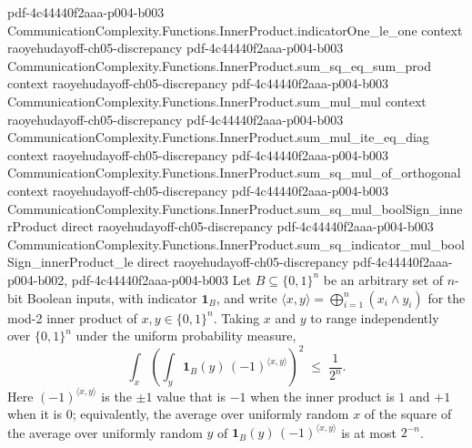 \begin{lemma}
  {pdf-4c44440f2aaa-p004-b003}
\proofstep
  {CommunicationComplexity.Functions.InnerProduct.indicatorOne_le_one}
  {context}
  {raoyehudayoff-ch05-discrepancy}
  {pdf-4c44440f2aaa-p004-b003}
\proofstep
  {CommunicationComplexity.Functions.InnerProduct.sum_sq_eq_sum_prod}
  {context}
  {raoyehudayoff-ch05-discrepancy}
  {pdf-4c44440f2aaa-p004-b003}
\proofstep
  {CommunicationComplexity.Functions.InnerProduct.sum_mul_mul}
  {context}
  {raoyehudayoff-ch05-discrepancy}
  {pdf-4c44440f2aaa-p004-b003}
\proofstep
  {CommunicationComplexity.Functions.InnerProduct.sum_mul_ite_eq_diag}
  {context}
  {raoyehudayoff-ch05-discrepancy}
  {pdf-4c44440f2aaa-p004-b003}
\proofstep
  {CommunicationComplexity.Functions.InnerProduct.sum_sq_mul_of_orthogonal}
  {context}
  {raoyehudayoff-ch05-discrepancy}
  {pdf-4c44440f2aaa-p004-b003}
\proofstep
  {CommunicationComplexity.Functions.InnerProduct.sum_sq_mul_boolSign_innerProduct}
  {direct}
  {raoyehudayoff-ch05-discrepancy}
  {pdf-4c44440f2aaa-p004-b003}
\proofstep
  {CommunicationComplexity.Functions.InnerProduct.sum_sq_indicator_mul_boolSign_innerProduct_le}
  {direct}
  {raoyehudayoff-ch05-discrepancy}
  {pdf-4c44440f2aaa-p004-b002,
    pdf-4c44440f2aaa-p004-b003}
Let $B \subseteq \{0,1\}^n$ be an arbitrary set of $n$-bit Boolean inputs, with
indicator $\mathbf 1_B$, and write $\langle x,y\rangle = \bigoplus_{i=1}^{n} (x_i \wedge
y_i)$ for the mod-2 inner product of $x,y \in \{0,1\}^n$. Taking $x$ and $y$ to range
independently over $\{0,1\}^n$ under the uniform probability measure,
\[
\int_{x}\left(\int_{y} \mathbf 1_B(y)\,(-1)^{\langle x,y\rangle}\right)^{2} \;\le\;
\frac{1}{2^{n}}.
\]
Here $(-1)^{\langle x,y\rangle}$ is the $\pm 1$ value that is $-1$ when the inner
product is $1$ and $+1$ when it is $0$; equivalently, the average over uniformly random
$x$ of the square of the average over uniformly random $y$ of $\mathbf
1_B(y)\,(-1)^{\langle x,y\rangle}$ is at most $2^{-n}$.
\end{lemma}

